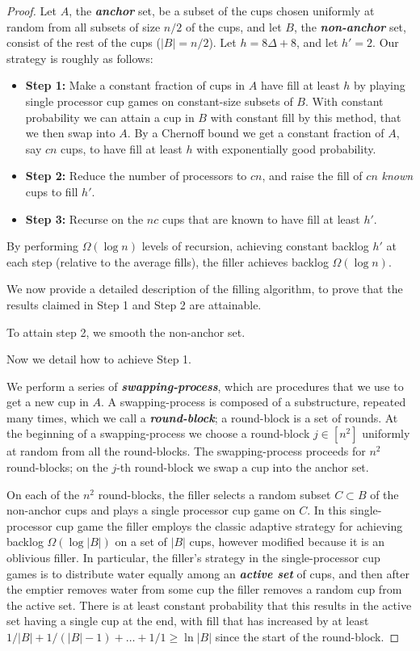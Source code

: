 \documentclass[twocolumn]{article}[10pt]
\newcommand{\defn}[1]{{\textit{\textbf{\boldmath #1}}}\xspace}
\begin{document}
\begin{proof}
    Let $A$, the \defn{anchor} set, be a subset of the cups chosen uniformly at
  random from all subsets of size $n/2$ of the cups, and let $B$, the
  \defn{non-anchor} set, consist of the rest of the cups ($|B| = n/2$). Let $h
  = 8\Delta + 8$, and let $h' = 2$. Our strategy is roughly as follows: 
  \begin{itemize}
    \item \textbf{Step 1:} Make a constant fraction of cups in $A$ have fill at
      least $h$ by playing single processor cup games on constant-size subsets
      of $B$. With constant probability we can attain a cup in $B$ with
      constant fill by this method, that we then swap into $A$. By a Chernoff
      bound we get a constant fraction of $A$, say $cn$ cups, to have fill at
      least $h$ with exponentially good probability.
    \item \textbf{Step 2:} Reduce the number of processors to $cn$, and raise
      the fill of $cn$ \emph{known} cups to fill $h'$. 
    \item \textbf{Step 3:} Recurse on the $nc$ cups that are known to have fill
      at least $h'$.
  \end{itemize}

By performing $\Omega(\log n)$ levels of recursion, achieving constant backlog
$h'$ at each step (relative to the average fills), the filler achieves backlog
$\Omega(\log n)$.

We now provide a detailed description of the filling algorithm, to prove that
the results claimed in Step 1 and Step 2 are attainable.

To attain step 2, we smooth the non-anchor set.

Now we detail how to achieve Step 1.

We perform a series of \defn{swapping-process}, which are procedures that we
use to get a new cup in $A$. A swapping-process is composed of a substructure,
repeated many times, which we call a \defn{round-block}; a round-block is a set
of rounds. At the beginning of a swapping-process we choose a round-block $j
\in [n^2]$ uniformly at random from all the round-blocks. The swapping-process
proceeds for $n^2$ round-blocks; on the $j$-th round-block we swap a cup into
the anchor set.

On each of the $n^2$ round-blocks, the filler selects a random subset $C\subset
B$ of the non-anchor cups and plays a single processor cup game on $C$. In this
single-processor cup game the filler employs the classic adaptive strategy for
achieving backlog $\Omega(\log |B|)$ on a set of $|B|$ cups, however modified
because it is an oblivious filler. In particular, the filler's strategy in the
single-processor cup games is to distribute water equally among an \defn{active
set} of cups, and then after the emptier removes water from some cup the filler
removes a random cup from the active set. There is at least constant
probability that this results in the active set having a single cup at the end,
with fill that has increased by at least $1/|B| + 1/(|B|-1) + \ldots + 1/1 \ge
\ln |B|$ since the start of the round-block.


\end{proof}
\end{document}
